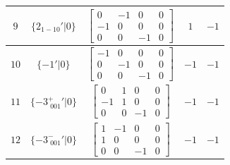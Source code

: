 \documentclass[fleqn,8pt]{jsarticle}
\begin{document}
\begin{longtable}{ccccc}
$ 9 $ & $ \{2{}_{1-10}{}'|0\} $ & $ \begin{bmatrix} 0 & -1 & 0 & 0 \\ -1 & 0 & 0 & 0 \\ 0 & 0 & -1 & 0 \end{bmatrix} $ & $ 1 $ & $ -1 $ \\ \hline
$ 10 $ & $ \{-1{}'|0\} $ & $ \begin{bmatrix} -1 & 0 & 0 & 0 \\ 0 & -1 & 0 & 0 \\ 0 & 0 & -1 & 0 \end{bmatrix} $ & $ -1 $ & $ -1 $ \\ \hline
$ 11 $ & $ \{-3^{+}_{\,\,001}{}'|0\} $ & $ \begin{bmatrix} 0 & 1 & 0 & 0 \\ -1 & 1 & 0 & 0 \\ 0 & 0 & -1 & 0 \end{bmatrix} $ & $ -1 $ & $ -1 $ \\ \hline
$ 12 $ & $ \{-3^{-}_{\,\,001}{}'|0\} $ & $ \begin{bmatrix} 1 & -1 & 0 & 0 \\ 1 & 0 & 0 & 0 \\ 0 & 0 & -1 & 0 \end{bmatrix} $ & $ -1 $ & $ -1 $ \\
\end{longtable}
\end{document}
